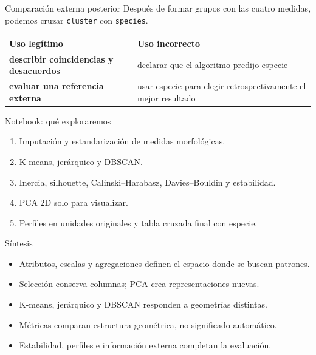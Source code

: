 \documentclass[aspectratio=169,10pt]{beamer}
\begin{document}
\begin{frame}{Comparación externa posterior}\small
Después de formar grupos con las cuatro medidas, podemos cruzar \texttt{cluster} con \texttt{species}.
\begin{tabularx}{\textwidth}{>{\bfseries}X X}\toprule Uso legítimo & Uso incorrecto\\\midrule describir coincidencias y desacuerdos & declarar que el algoritmo predijo especie\\ evaluar una referencia externa & usar especie para elegir retrospectivamente el mejor resultado\\\bottomrule\end{tabularx}
\end{frame}

\begin{frame}{Notebook: qué exploraremos}\small
\begin{enumerate}\item Imputación y estandarización de medidas morfológicas.\item K-means, jerárquico y DBSCAN.\item Inercia, silhouette, Calinski--Harabasz, Davies--Bouldin y estabilidad.\item PCA 2D solo para visualizar.\item Perfiles en unidades originales y tabla cruzada final con especie.\end{enumerate}
\end{frame}

\begin{frame}{Síntesis}\small
\begin{itemize}\item Atributos, escalas y agregaciones definen el espacio donde se buscan patrones.\item Selección conserva columnas; PCA crea representaciones nuevas.\item K-means, jerárquico y DBSCAN responden a geometrías distintas.\item Métricas comparan estructura geométrica, no significado automático.\item Estabilidad, perfiles e información externa completan la evaluación.\end{itemize}
\end{frame}
\end{document}
